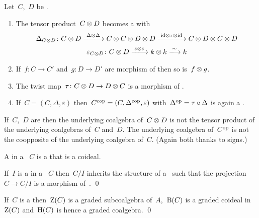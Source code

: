 \documentclass[a4paper,10pt,headings=standardclasses]{scrartcl}
\begin{document}
\begin{lemma}
  Let~$C$,~$D$ be {\dgcs}.
  \begin{enumerate}
    \item
      The tensor product~$C \otimes D$ becomes a {\dgc} with
      \begin{gather*}
        \Delta_{C \tensor D}
        \colon
        C \tensor D
        \xlongto{\Delta \tensor \Delta}
        C \tensor C \tensor D \tensor D
        \xlongto{{\id} \tensor \tau \tensor {\id}}
        C \tensor D \tensor C \tensor D
        \\
        \varepsilon_{C \tensor D}
        \colon
        C \tensor D
        \xlongto{\varepsilon \tensor \varepsilon}
        k \tensor k
        \xlongto{\sim}
        k
      \end{gather*}
    \item
      If~$f \colon C \to C'$ and~$g \colon D \to D'$ are morphism of {\dgcs} then so is~$f \otimes g$.
    \item
      The twist map~$\tau \colon C \otimes D \to D \otimes C$ is a morphism of {\dgcs}.
    \item
      If~$C = (C, \Delta, \varepsilon)$ then~$C^{\mathrm{cop}} = (C, \Delta^{\mathrm{cop}}, \varepsilon)$ with~$\Delta^{\mathrm{op}} = \tau \circ \Delta$ is again a {\dgc}.
  \end{enumerate}
\end{lemma}

\begin{warning}
  If~$C$,~$D$ are {\dgcs} then the underlying coalgebra of~$C \otimes D$ is not the tensor product of the underlying coalgebras of~$C$ and~$D$.
  The underlying coalgebra of~$C^{\mathrm{op}}$ is not the coopposite of the underlying coalgebra of~$C$.
  (Again both thanks to signs.)
\end{warning}

\begin{definition}
  A  in a {\dgc}~$C$ is a {\dgsub} that is a coideal.
\end{definition}

\begin{lemma}
  If~$I$ is a {\dgci} in a {\dgc}~$C$ then~$C/I$ inherits the structure of a~{\dgc} such that the projection~$C \to C/I$ is a morphism of~{\dgc}.
  \qed
\end{lemma}

\begin{proposition}
  If~$C$ is a {\dgc} then~$\operatorname{Z}(C)$ is a graded subcoalgebra of~$A$,~$\operatorname{B}(C)$ is a graded coideal in~$\operatorname{Z}(C)$ and~$\operatorname{H}(C)$ is hence a graded coalgebra.
  \qed
\end{proposition}
\end{document}

